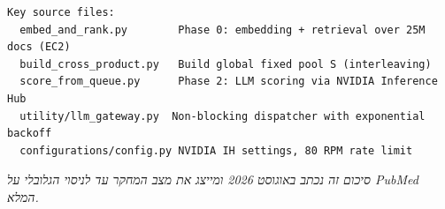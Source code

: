 \documentclass[12pt, a4paper]{article}
\begin{document}
\begin{english}
\begin{lstlisting}[style=pipeline]
Key source files:
  embed_and_rank.py        Phase 0: embedding + retrieval over 25M docs (EC2)
  build_cross_product.py   Build global fixed pool S (interleaving)
  score_from_queue.py      Phase 2: LLM scoring via NVIDIA Inference Hub
  utility/llm_gateway.py  Non-blocking dispatcher with exponential backoff
  configurations/config.py NVIDIA IH settings, 80 RPM rate limit
\end{lstlisting}
\end{english}

\bigskip
\begin{center}
\textit{סיכום זה נכתב באוגוסט 2026 ומייצג את מצב המחקר עד לניסוי הגלובלי על \textenglish{PubMed} המלא.}
\end{center}
\end{document}
